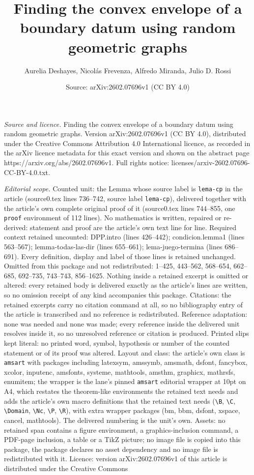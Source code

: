 \documentclass[10pt,a4paper]{amsart}
\title[Finding the convex envelope of a boundary datum using random]{Finding the convex envelope of a boundary datum using random geometric graphs}
\author{Aurelia Deshayes, Nicol\'as Frevenza, Alfredo Miranda, Julio D. Rossi}
\date{Source: arXiv:2602.07696v1 (CC BY 4.0)}
\begin{document}
\maketitle

\noindent\emph{Source and licence.} Finding the convex envelope of a boundary datum using random geometric graphs. Version arXiv:2602.07696v1 (CC BY 4.0), distributed under the Creative Commons Attribution 4.0 International licence, as recorded in the arXiv licence metadata for this exact version and shown on the abstract page https://arxiv.org/abs/2602.07696v1. Full rights notice: licenses/arxiv-2602.07696-CC-BY-4.0.txt.\par\smallskip

\noindent\textit{Editorial scope.} Counted unit: the Lemma whose source label is \texttt{lema-cp} in the article (source0.tex lines 736--742, source label \texttt{lema-cp}), delivered together with the article's own complete original proof of it (source0.tex lines 744--855, one \texttt{proof} environment of 112 lines). No mathematics is written, repaired or re-derived: statement and proof are the article's own text line for line. Required context retained uncounted: DPP.intro (lines 426--442); condicion.lemma1 (lines 563--567); lemma-todas-las-dir (lines 655--661); lema-juego-termina (lines 686--691). Every definition, display and label of those lines is retained unchanged. Omitted from this package and not redistributed: 1--425, 443--562, 568--654, 662--685, 692--735, 743--743, 856--1625. Nothing inside a retained excerpt is omitted or altered: every retained body is delivered exactly as the article's lines are written, so no omission receipt of any kind accompanies this package. Citations: the retained excerpts carry no citation command at all, so no bibliography entry of the article is transcribed and no reference is redistributed. Reference adaptation: none was needed and none was made; every reference inside the delivered unit resolves inside it, so no unresolved reference or citation is produced. Printed slips kept literal: no printed word, symbol, hypothesis or number of the counted statement or of its proof was altered. Layout and class: the article's own class is \texttt{amsart} with packages including latexsym, amssymb, amsmath, dsfont, fancybox, xcolor, inputenc, amsfonts, systeme, mathtools, amsthm, graphicx, mathrsfs, enumitem; the wrapper is the lane's pinned \texttt{amsart} editorial wrapper at 10pt on A4, which restates the theorem-like environments the retained text needs and adds the article's own macro definitions that the retained text needs (\texttt{\textbackslash B}, \texttt{\textbackslash C}, \texttt{\textbackslash Domain}, \texttt{\textbackslash Nc}, \texttt{\textbackslash P}, \texttt{\textbackslash R}), with extra wrapper packages (bm, bbm, dsfont, xspace, cancel, mathtools). The delivered numbering is the unit's own. Assets: no retained span contains a figure environment, a graphics-inclusion command, a PDF-page inclusion, a table or a TikZ picture; no image file is copied into this package, the package declares no asset dependency and no image file is redistributed with it. Licence: version arXiv:2602.07696v1 of this article is distributed under the Creative Commons 
\end{document}
